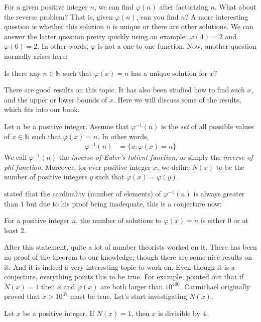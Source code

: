 For a given positive integer $n$, we can find $\varphi(n)$ after factorizing $n$. What about the reverse problem? That is, given $\varphi(n)$, can you find $n$? A more interesting question is whether this solution $n$ is unique or there are other solutions. We can answer the latter question pretty quickly using an example: $\varphi(4)=2$ and $\varphi (6)=2$. In other words, $\varphi $ is not a one to one function. Now, another question normally arises here:
	\begin{problem}
		Is there any $n\in\mathbb{N}$ such that $\varphi(x)=n$ has a unique solution for $x$?
	\end{problem}
There are good results on this topic. It has also been studied how to find such $x$, and the upper or lower bounds of $x$. Here we will discuss some of the results, which fits into our book.
	\begin{definition}
		Let $n$ be a positive integer. Assume that $\varphi ^{-1}(n)$ is the \textit{set} of all possible values of $x\in\mathbb{N} $ such that $\varphi (x)=n$. In other words,
			\begin{align*}
				\varphi^{-1}(n) & = \{x:\varphi(x)=n\}
			\end{align*}
		We call $\varphi^{-1}(n)$ the \textit{inverse of Euler's totient function}, or simply the \textit{inverse of phi function}. Moreover, for ever positive integer $x$, we define $N(x)$ to be the number of positive integers $y$ such that $\varphi(x)=\varphi(y)$.
	\end{definition}

\textcite{carmichael_1907} stated that the cardinality (number of elements) of $\varphi^{-1}(n)$ is always greater than $1$ but due to his proof being inadequate, this is a conjecture now:
	\begin{conjecture}
		For a positive integer $n$, the number of solutions to $\varphi(x)=n$ is either $0$ or at least $2$.
	\end{conjecture}
After this statement, quite a lot of number theorists worked on it. There has been no proof of the theorem to our knowledge, though there are some nice results on it. And it is indeed a very interesting topic to work on. Even though it is a conjecture, everything points this to be true. For example, \textcite{jr._1947} pointed out that if $N(x)=1$ then $x$ and $\varphi(x)$ are both larger than $10^{400}$. Carmichael originally proved that $x>10^{37}$ must be true. Let's start investigating $N(x)$.
	\begin{theorem}
		Let $x$ be a positive integer. If $N(x)=1$, then $x$ is divisible by $4$.
	\end{theorem}

